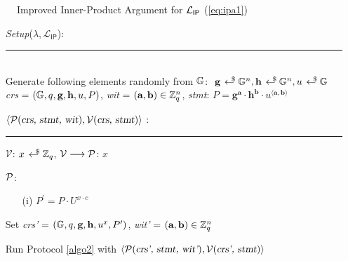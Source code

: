 \begin{figure}[h!]
    \caption{Improved Inner-Product Argument for $\L_{\textsf{IP}}$ (\ref{eq:ipa1}) }
    \label{algo3}
\end{figure}
\begin{mdframed}
    \begin{itemize}[itemsep=4pt]
        \item[] \textsl{Setup}($\lambda, \mathcal{L}_{\textsf{IP}}$):
        \\[-5pt]\rule{\textwidth}{0.4pt}\\ 
        Generate following elements randomly from $\G$: $\ \textbf{g} \rgen \G^{n}, \textbf{h} \rgen \G^n, u \rgen \G$
        \\[2pt]
        \textsl{crs} = $(\G, q, \textbf{g}, \textbf{h}, u, P)$, \textsl{wit} = $(\textbf{a}, \textbf{b}) \in \Z_q^n$, \textsl{stmt}: $P = \textbf{g}^\textbf{a} \cdot \textbf{h}^\textbf{b} \cdot u^{\langle \textbf{a},\textbf{b} \rangle}$
        \vspace{2pt}
    
        \item[] $\langle \mathcal{P}(\textsl{crs, stmt, wit}), \mathcal{V}(\textsl{crs, stmt}) \rangle$ :
        \\[-5pt]\rule{\textwidth}{0.4pt}

        \vspace{-4pt}
        \item[] $\mathcal{V}$: $x \rgen \Z_q$, $\mathcal{V} \longrightarrow \P$: $x$
    
        \vspace{-4pt}
        \item[] $\P$: \vspace{-4pt}
        \begin{enumerate}[itemsep=5pt]
            \item[(i)] $P^{\prime} = P \cdot U^{x \cdot c}$ 
        \end{enumerate}

        \item[] Set \textsl{crs'} = $(\G, q, \textbf{g}, \textbf{h}, u^x, P^{\prime})$, \textsl{wit'} = $(\textbf{a}, \textbf{b}) \in \Z_q^n$
      
        \item[] Run Protocol \ref{algo2} with $\langle \mathcal{P}(\textsl{crs', stmt, wit'}), \mathcal{V}(\textsl{crs', stmt}) \rangle$
      
    \end{itemize}
\end{mdframed}

